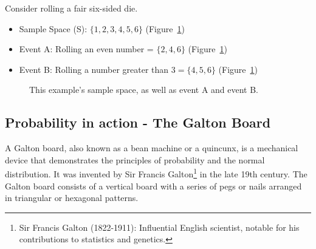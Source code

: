 \documentclass[
  a4paper,
]{scrbook}
\providecommand{\tightlist}{%
  \setlength{\itemsep}{0pt}\setlength{\parskip}{0pt}}\usepackage{longtable,booktabs,array}
\begin{document}
Consider rolling a fair six-sided die.

\begin{itemize}
\tightlist
\item
  Sample Space (S): \(\{1, 2, 3, 4, 5, 6\}\) (Figure~\ref{fig-prob})
\item
  Event A: Rolling an even number = \(\{2, 4, 6\}\)
  (Figure~\ref{fig-prob})
\item
  Event B: Rolling a number greater than \(3 = \{4, 5, 6\}\)
  (Figure~\ref{fig-prob})
\end{itemize}

\begin{figure}[ht]


\caption{\label{fig-prob}This example's sample space, as well as event A
and event B.}

\end{figure}%

\subsection{Probability in action - The Galton
Board}\label{probability-in-action---the-galton-board}

A Galton board, also known as a bean machine or a quincunx, is a
mechanical device that demonstrates the principles of probability and
the normal distribution. It was invented by Sir Francis
Galton\footnote{Sir Francis Galton (1822-1911): Influential English
  scientist, notable for his contributions to statistics and genetics.}
in the late 19th century. The Galton board consists of a vertical board
with a series of pegs or nails arranged in triangular or hexagonal
patterns.
\end{document}
